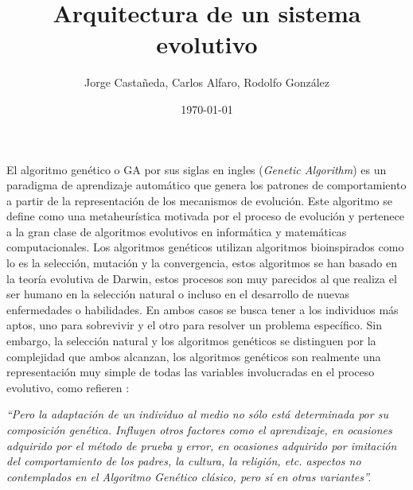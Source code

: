 \documentclass[10pt,twocolumn,a4paper]{articuloAPA}
\author{Jorge Castañeda, Carlos Alfaro, Rodolfo González}
\title{Arquitectura de un sistema evolutivo}%
\date{\today}
\begin{document}

El algoritmo genético o GA por sus siglas en ingles (\textit{Genetic Algorithm}) es un paradigma de aprendizaje automático que genera los patrones de comportamiento a partir de la representación de los mecanismos de evolución. Este algoritmo se define como una metaheurística motivada por el proceso de evolución y pertenece a la gran clase de algoritmos evolutivos en informática y matemáticas computacionales. Los algoritmos genéticos utilizan algoritmos bioinspirados como lo es la selección, mutación y la convergencia, estos algoritmos se han basado en la teoría evolutiva de Darwin, estos procesos son muy parecidos al que realiza el ser humano en la selección natural o incluso en el desarrollo de nuevas enfermedades o habilidades. En ambos casos se busca tener a los individuos más aptos, uno para sobrevivir y el otro para resolver un problema específico. Sin embargo, la selección natural y los algoritmos genéticos se distinguen por la complejidad que ambos alcanzan, los algoritmos genéticos son realmente una representación muy simple de todas las variables involucradas en el proceso evolutivo, como refieren \textcite{gestal_2010}: 

\begin{displayquote}
  \textit{
    ``Pero la adaptación de un individuo al medio no sólo está determinada por su composición genética. Influyen otros factores como el aprendizaje, en ocasiones adquirido por el método de prueba y error, en ocasiones adquirido por imitación del comportamiento de los padres, la cultura, la religión, etc. aspectos no contemplados en el Algoritmo Genético clásico, pero sí en otras variantes''.
  }
\end{displayquote}
\end{document}

